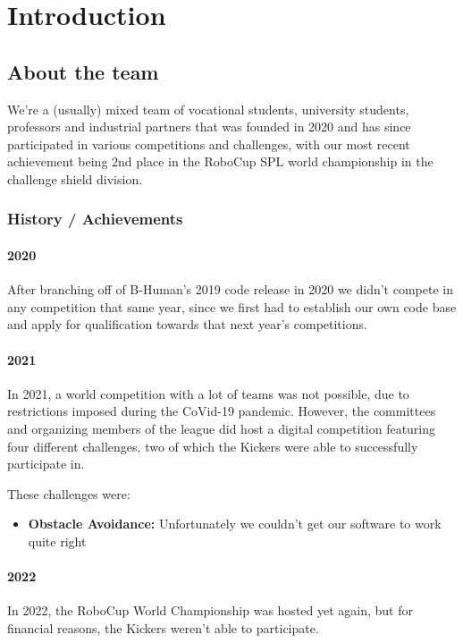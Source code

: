 \section{Introduction}

\subsection{About the team}

We're a (usually) mixed team of vocational students, university students, professors and industrial partners that was founded in 2020 and has since participated in various competitions and challenges, with our most recent achievement being 2nd place in the RoboCup SPL world championship in the challenge shield division.

\subsubsection{History / Achievements}

\paragraph{2020} After branching off of B-Human's 2019 code release in 2020 we didn't compete in any competition that same year, since we first had to establish our own code base and apply for qualification towards that next year's competitions.

\paragraph{2021} In 2021, a world competition with a lot of teams was not possible, due to restrictions imposed during the CoVid-19 pandemic. However, the committees and organizing members of the league did host a digital competition featuring four different challenges, two of which the Kickers were able to successfully participate in.

These challenges were:
\begin{itemize}
	\item \textbf{Obstacle Avoidance:} Unfortunately we couldn't get our software to work quite right 
\end{itemize}


\paragraph{2022} In 2022, the RoboCup World Championship was hosted yet again, but for financial reasons, the Kickers weren't able to participate.

